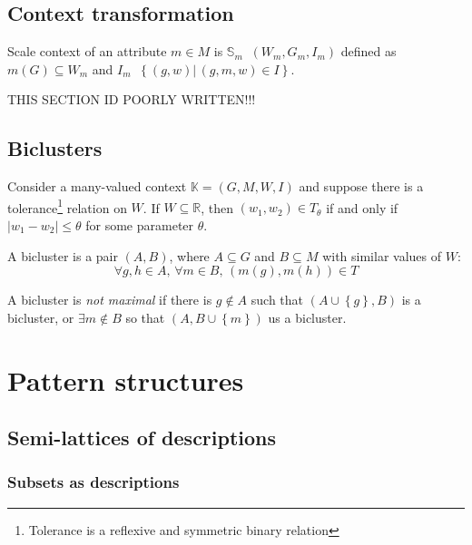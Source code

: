 \documentclass[a4paper]{article}
\newcommand{\obj}[1]{{\left\{ #1 \right \}}}
\newcommand{\brac}[1]{{\left ( #1 \right )}}
\newcommand{\induc}[1]{{\left . #1 \right \vert}}
\newcommand{\abs}[1]{{\left | #1 \right |}}
\newcommand{\Real}{\mathbb{R}}
\newcommand{\Ctx}{\mathbb{K}}
\newcommand{\defn}{\mathop{\overset{\Delta}{=}}\nolimits}
\begin{document}

\subsection{Context transformation} %
\label{sub:context_transformation}

Scale context of an attribute $m\in M$ is $\mathbb{S}_m\defn \brac{W_m, G_m, I_m}$ defined as $m(G) \subseteq W_m$ and $I_m\defn \obj{ \induc{(g,w)}\,(g,m,w)\in I }$.

THIS SECTION ID POORLY WRITTEN!!!


\subsection{Biclusters} %
\label{sub:biclusters}
Consider a many-valued context $\Ctx=\brac{G,M,W,I}$ and suppose there is a tolerance\footnote{Tolerance is a reflexive and symmetric binary relation} relation on $W$. If $W\subseteq \Real$, then $(w_1,w_2)\in T_\theta$ if and only if $\abs{w_1-w_2}\leq \theta$ for some parameter $\theta$.

A bicluster is a pair $(A,B)$, where $A\subseteq G$ and $B\subseteq M$ with similar values of $W$:\[\forall g,h\in A,\, \forall m\in B,\,\brac{m(g), m(h)}\in T\]

A bicluster is \emph{not maximal} if there is $g\notin A$ such that $\brac{A\cup\obj{g},B}$ is a bicluster, or $\exists m\notin B$ so that $\brac{A,B\cup\obj{m}}$ us a bicluster.



\section{Pattern structures} %
\label{sec:pattern_structures}

\subsection{Semi-lattices of descriptions} %
\label{sub:semi_lattices_of_descriptions}

\subsubsection*{Subsets as descriptions} %
\label{ssub:subsets_as_descriptions}
\end{document}
